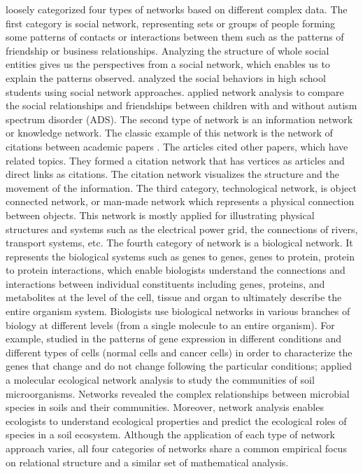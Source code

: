  loosely categorized four types of networks based on different complex data. The first category is social network, representing sets or groups of people forming some patterns of contacts or interactions between them such as the patterns of friendship or business relationships. Analyzing the structure of whole social entities gives us the perspectives from a social network, which enables us to explain the patterns observed.  analyzed the social behaviors in high school students using social network approaches.  applied network analysis to compare the social relationships and friendships between children with and without autism spectrum disorder (ADS). The second type of network is an information network or knowledge network. The classic example of this network is the network of citations between academic papers . The articles cited other papers, which have related topics. They formed a citation network that has vertices as articles and direct links as citations. The citation network visualizes the structure and the movement of the information. The third category, technological network, is object connected network, or man-made network which represents a physical connection between objects. This network is mostly applied for illustrating physical structures and systems such as the electrical power grid, the connections of rivers, transport systems, etc. The fourth category of network is a biological network. It represents the biological systems such as genes to genes, genes to protein, protein to protein interactions, which enable biologists understand the connections and interactions between individual constituents including genes, proteins, and metabolites at the level of the cell, tissue and organ to ultimately describe the entire organism system. Biologists use biological networks in various branches of biology at different levels (from a single molecule to an entire organism). For example,  studied in the patterns of gene expression in different conditions and different types of cells (normal cells and cancer cells) in order to characterize the genes that change and do not change following the particular conditions;  applied a molecular ecological network analysis to study the communities of soil microorganisms. Networks revealed the complex relationships between microbial species in soils and their communities. Moreover, network analysis enables ecologists to understand ecological properties and predict the ecological roles of species in a soil ecosystem. Although the application of each type of network approach varies, all four categories of networks share a common empirical focus on relational structure and a similar set of mathematical analysis.  

